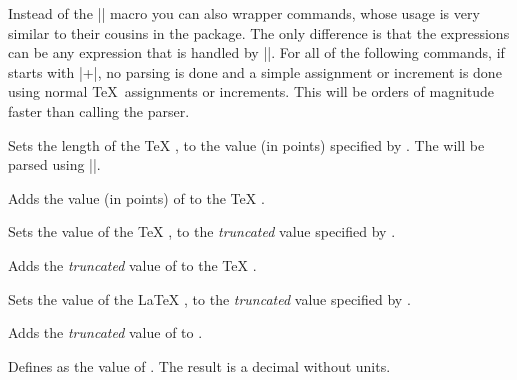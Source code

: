 Instead of the |\pgfmathparse| macro you can also wrapper commands,
whose usage is very similar to their cousins in the \calcname{} 
package. The only difference is that the expressions can be any
expression that is handled by |\pgfmathparse|.
For all of the following commands, if  starts with
|+|, no parsing is done and a simple assignment or increment is done
using normal \TeX\ assignments or increments. This will be orders of
magnitude faster than calling the parser. 

\begin{command}{\pgfmathsetlength{}}
  Sets the length of the \TeX{} , to the value
  (in points) specified by . The 
  will be parsed using |\pgfmathparse|.
\end{command}

\begin{command}{\pgfmathaddtolength{}}
  Adds the value (in points) of  to the \TeX{} 
  . 
\end{command}

\begin{command}{\pgfmathsetcount{}}
  Sets the value of the \TeX{} , to the 
  \emph{truncated} value specified by . 
\end{command}

\begin{command}{\pgfmathaddtocount{}}
  Adds the \emph{truncated} value  of  to the \TeX{} 
  .
\end{command}

\begin{command}{\pgfmathsetcounter{}}
  Sets the value of the \LaTeX{} , to the \emph{truncated} 
  value specified by . 
\end{command}

\begin{command}{\pgfmathaddtocounter{}}
  Adds the \emph{truncated} value  of  to 
  .
\end{command}

\begin{command}{\pgfmathsetmacro{}}
  Defines  as the  value of . The result
  is a decimal without units.
\end{command}

